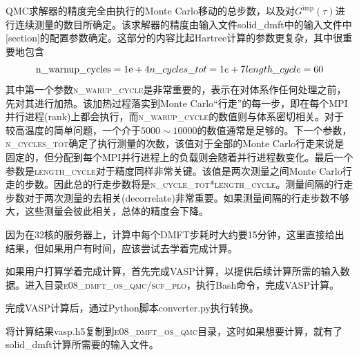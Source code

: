 \textrm{QMC}求解器的精度完全由执行的\textrm{Monte Carlo}移动的总步数，以及对$G^{\mathrm{imp}}(\tau)$进行连续测量的数目所确定。该求解器的精度由输入文件\textrm{solid\_dmft}中的输入文件中\textrm{[section]}的配置参数确定。这部分的内容比起\textrm{Hartree}计算的参数更复杂，其中很重要地包含
\begin{displaymath}
	\mathrm{n\_warnup\_cycles}=1\mathrm{e}+4\\
	n\_cycles\_tot=1e+7\\
	length\_cycle=60
\end{displaymath}
其中第一个参数\textsc{n\_warup\_cycle}是非常重要的，表示在对体系作任何处理之前，先对其进行加热。该加热过程落实到\textrm{Monte Carlo}``行走''的每一步，即在每个\textrm{MPI}并行进程\textrm{(rank)}上都会执行，而\textsc{n\_warup\_cycle}的数值则与体系密切相关。对于较高温度的简单问题，一个介于$5000\sim10000$的数值通常是足够的。下一个参数，\textsc{n\_cycles\_tot}确定了执行测量的次数，该值对于全部的\textrm{Monte Carlo}行走来说是固定的，但分配到每个\textrm{MPI}并行进程上的负载则会随着并行进程数变化。最后一个参数是\textsc{length\_cycle}对于精度同样非常关键。该值是两次测量之间\textrm{Monte Carlo}行走的步数。因此总的行走步数将是\textsc{n\_cycle\_tot}*\textsc{length\_cycle}。测量间隔的行走步数对于两次测量的去相关\textrm{(decorrelate)}非常重要。如果测量间隔的行走步数不够大，这些测量会彼此相关，总体的精度会下降。%

因为在32核的服务器上，计算中每个\textrm{DMFT}步耗时大约要15分钟，这里直接给出结果，但如果用户有时间，应该尝试去学着完成计算。

如果用户打算学着完成计算，首先完成\textrm{VASP}计算，以提供后续计算所需的输入数据。进入目录\textsc{e08\_dmft\_os\_qmc/scf\_plo}，执行\textrm{Bash}命令，完成\textrm{VASP}计算。

完成\textrm{VASP}计算后，通过\textrm{Python}脚本\textrm{converter.py}执行转换。

将计算结果\textrm{vasp.h5}复制到\textsc{e08\_dmft\_os\_qmc}目录，这时如果想要计算，就有了\textrm{solid\_dmft}计算所需要的输入文件。

